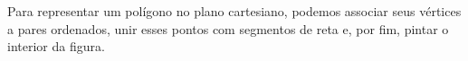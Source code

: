 \documentclass[preview]{standalone}
\begin{document}
\begin{center}
Para representar um polígono no plano cartesiano, podemos associar seus vértices a pares ordenados, unir esses pontos com segmentos de reta e, por fim, pintar o interior da figura.
\end{center}
\end{document}
